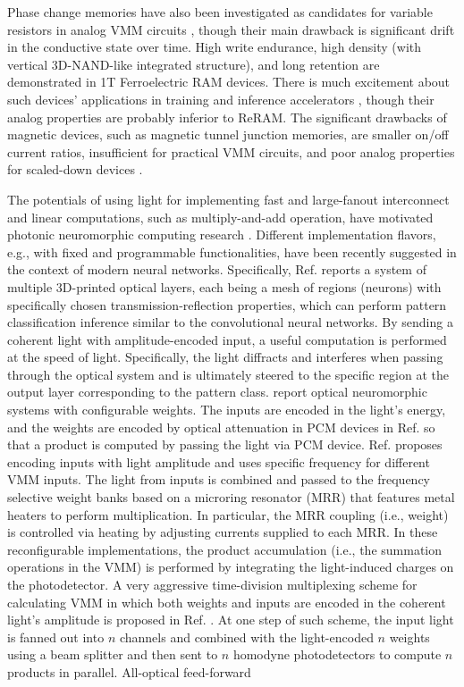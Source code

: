 Phase change memories have also been investigated as candidates for variable resistors in analog VMM circuits \cite{Burr2015, Joshi2020}, though their main drawback is significant drift in the conductive state over time. High write endurance, high density (with vertical 3D-NAND-like integrated structure), and long retention are demonstrated in 1T Ferroelectric RAM devices. There is much excitement about such devices' applications in training and inference accelerators \cite{Ni2018IEDM}, though their analog properties are probably inferior to ReRAM.  The significant drawbacks of magnetic devices, such as magnetic tunnel junction memories, are smaller on/off current ratios, insufficient for practical VMM circuits, and poor analog properties for scaled-down devices \cite{Grollier2020}. 

The potentials of using light for implementing fast and large-fanout interconnect and linear computations, such as multiply-and-add operation, have motivated photonic neuromorphic computing research \cite{Berggren2020,Goi2020,Shasti2021,Hamley2019}. Different implementation flavors, e.g., with fixed \cite{Lin2019Sciece} and programmable \cite{Rios2019, Hamerly2019PhysRevX, Shen2017NatPhot, Tait2016} functionalities, have been recently suggested in the context of modern neural networks. Specifically, Ref. \cite{Lin2019Sciece} reports a system of multiple 3D-printed optical layers, each being a mesh of regions (neurons) with specifically chosen transmission-reflection properties, which can perform pattern classification inference similar to the convolutional neural networks. By sending a coherent light with amplitude-encoded input, a useful computation is performed at the speed of light. Specifically, the light diffracts and interferes when passing through the optical system and is ultimately steered to the specific region at the output layer corresponding to the pattern class. \cite{Rios2019, Hamerly2019PhysRevX, Shen2017NatPhot, Tait2016} report optical neuromorphic systems with configurable weights. The inputs are encoded in the light's energy, and the weights are encoded by optical attenuation in PCM devices in Ref. \cite{Rios2019} so that a product is computed by passing the light via PCM device. Ref. \cite{Tait2016} proposes encoding inputs with light amplitude and uses specific frequency for different VMM inputs. The light from inputs is combined and passed to the frequency selective weight banks based on a microring resonator (MRR) that features metal heaters to perform multiplication. In particular, the MRR coupling (i.e., weight) is controlled via heating by adjusting currents supplied to each MRR. In these reconfigurable implementations, the product accumulation (i.e., the summation operations in the VMM) is performed by integrating the light-induced charges on the photodetector. A very aggressive time-division multiplexing scheme for calculating VMM in which both weights and inputs are encoded in the coherent light's amplitude is proposed in Ref. \cite{Hamerly2019PhysRevX}. At one step of such scheme, the input light is fanned out into $n$ channels and combined with the light-encoded $n$ weights using a beam splitter and then sent to $n$ homodyne photodetectors to compute $n$ products in parallel. All-optical feed-forward 